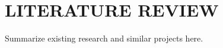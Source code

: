 \chapter{LITERATURE REVIEW}
\label{ch:lit_review}

Summarize existing research and similar projects here.
